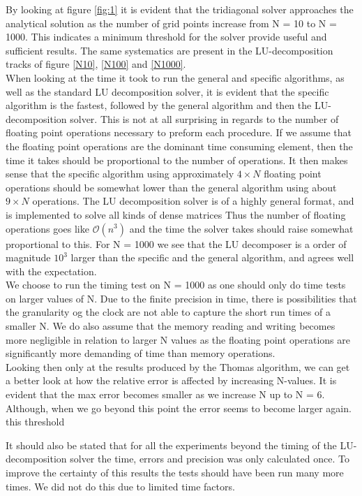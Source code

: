 \documentclass[%
reprint,
amsmath,amssymb,
aps,
]{revtex4-1}
\begin{document}
By looking at figure \ref{fig:1} it is evident that the tridiagonal solver approaches the analytical solution as the number of grid points increase from N = 10 to N = 1000. This indicates a minimum threshold for the solver provide useful and sufficient results. The same systematics are present in the LU-decomposition tracks of figure \ref{N10}, \ref{N100} and \ref{N1000}.  \\
\indent When looking at the time it took to run the general and specific algorithms, as well as the standard LU decomposition solver, it is evident that the specific algorithm is the fastest, followed by the general algorithm and then the LU-decomposition solver. This is not at all surprising in regards to the number of floating point operations necessary to preform each procedure. If we assume that the floating point operations are the dominant time consuming element, then the time it takes should be proportional to the number of operations. It then makes sense that the specific algorithm using approximately $4\times N$ floating point operations  should be somewhat lower than the general algorithm using about $9\times N$ operations. The LU decomposition solver is of a highly general format, and is implemented to solve all kinds of dense matrices Thus the number of floating operations goes like $\mathcal{O}(n^3)$ and the time the solver takes should raise somewhat proportional to this. For N = 1000 we see that the LU decomposer is a order of magnitude $10^3$ larger than the specific and the general algorithm, and agrees well with the expectation. \\
We choose to run the timing test on N = 1000 as one should only do time tests on larger \indent values of N. Due to the finite precision in time, there is possibilities that the granularity og the clock are not able to capture the short run times of a smaller N. We do also assume that the memory reading and writing becomes more negligible in relation to larger N values as the floating point operations are significantly more demanding of time than memory operations. \\
\indent Looking then only at the results produced by the Thomas algorithm, we can get a better look at how the relative error is affected by increasing N-values. It is evident that the max error becomes smaller as we increase N up to N = 6. Although, when we go beyond this point the error seems to become larger again. this threshold 

It should also be stated that for all the experiments beyond the timing of the LU-decomposition solver the time, errors and precision was only calculated once. To improve the certainty of this results the tests should have been run many more times. We did not do this due to limited time factors. 
\newpage 
\end{document}
